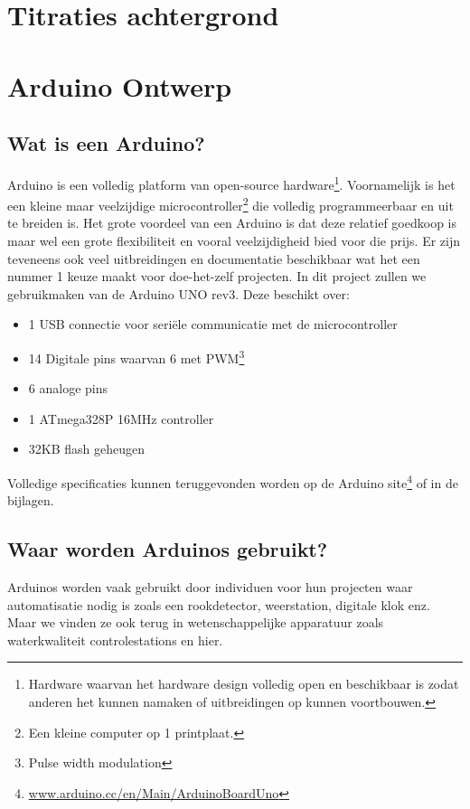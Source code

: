 \documentclass[11pt]{report}
\newcommand{\pbr}{\hfill\break\hfill\break}
\newcommand{\lbr}{\hfill\break}
\begin{document}
\newpage

\pagestyle{fancy}
\fancyhf{}
\fancyhead[R]{\leftmark\ \rule[-0.25em]{0.14em}{1.3em}\ \thepage}

\chapter{Titraties achtergrond}

\chapter{Arduino Ontwerp}
\section{Wat is een Arduino?}
Arduino is een volledig platform van open-source hardware\footnote{Hardware waarvan het hardware design volledig open en beschikbaar is zodat anderen het kunnen namaken of uitbreidingen op kunnen voortbouwen.}. Voornamelijk is het een kleine maar veelzijdige microcontroller\footnote{Een kleine computer op 1 printplaat.} die volledig programmeerbaar en uit te breiden is.
\pbr
Het grote voordeel van een Arduino is dat deze relatief goedkoop is maar wel een grote flexibiliteit en vooral veelzijdigheid bied voor die prijs. Er zijn teveneens ook veel uitbreidingen en documentatie beschikbaar wat het een nummer 1 keuze maakt voor doe-het-zelf projecten.
\pbr
In dit project zullen we gebruikmaken van de Arduino UNO rev3.\lbr
Deze beschikt over:
\begin{itemize}
    \item 1 USB connectie voor seriële communicatie met de microcontroller
    \item 14 Digitale pins waarvan 6 met PWM\footnote{Pulse width modulation}
    \item 6 analoge pins
    \item 1 ATmega328P 16MHz controller
    \item 32KB flash geheugen
\end{itemize}
Volledige specificaties kunnen teruggevonden worden op de Arduino site\footnote{\url{www.arduino.cc/en/Main/ArduinoBoardUno}} of in de bijlagen.
\section{Waar worden Arduinos gebruikt?}
Arduinos worden vaak gebruikt door individuen voor hun projecten waar automatisatie nodig is zoals een rookdetector, weerstation, digitale klok enz. Maar we vinden ze ook terug in wetenschappelijke apparatuur zoals waterkwaliteit controlestations en hier.
\end{document}
